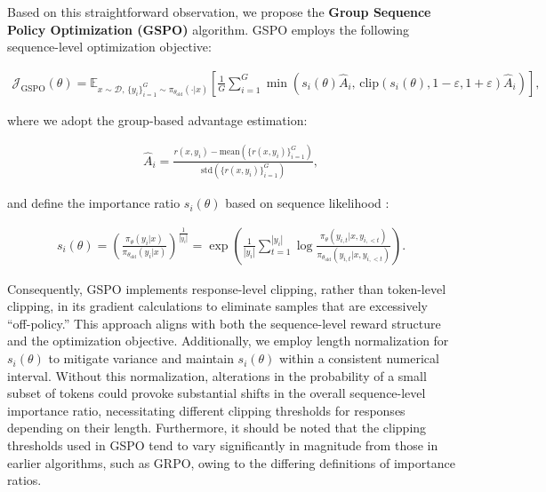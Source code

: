 Based on this straightforward observation, we propose the \textbf{Group Sequence Policy Optimization (GSPO)} algorithm. GSPO employs the following sequence-level optimization objective:

\begin{align}
\mathcal{J}_\text{GSPO} (\theta) =
\mathbb{E}_{ x \sim \mathcal{D},\, \{y_i\}_{i=1}^G \sim \pi_{\theta_\text{old}}( \cdot | x) }
\left[ 
\frac{1}{G} \sum_{i=1}^{G}
\min \left( s_{i}(\theta)  \widehat{A}_{i},  \, \mathrm{clip} \left( s_{i}(\theta), 1 - {\varepsilon}, 1 + {\varepsilon} \right) \widehat{A}_{i} \right) 
\right],
\label{equ:gspo}
\end{align}

where we adopt the group-based advantage estimation:

\begin{align}
\widehat{A}_{i} = \frac{r(x, y_i) - \mathrm{mean} \left( \{ r(x, y_i) \}_{i=1}^G \right) }{ \mathrm{std} \left( \{ r(x, y_i) \}_{i=1}^G \right) },
\end{align}

and define the importance ratio $s_{i}(\theta)$ based on sequence likelihood \citep{click}:

\begin{align}
s_{i}(\theta) = \left( \frac{ \pi_{\theta} (y_i | x) }{ \pi_{\theta_\text{old}} (y_i | x)} \right)^{\frac{1}{|y_i|}}
=
\exp \left( \frac{1}{|y_i|} \sum_{t=1}^{|y_i|} \log \frac{ \pi_{\theta} (y_{i,t} | x, y_{i,<t}) }{ \pi_{\theta_\text{old}} (y_{i,t} | x,y_{i,<t})} \right).
\end{align}

Consequently, GSPO implements response-level clipping, rather than token-level clipping, in its gradient calculations to eliminate samples that are excessively “off-policy.” This approach aligns with both the sequence-level reward structure and the optimization objective. Additionally, we employ length normalization for $s_{i}(\theta)$ to mitigate variance and maintain $s_{i}(\theta)$ within a consistent numerical interval. Without this normalization, alterations in the probability of a small subset of tokens could provoke substantial shifts in the overall sequence-level importance ratio, necessitating different clipping thresholds for responses depending on their length. Furthermore, it should be noted that the clipping thresholds used in GSPO tend to vary significantly in magnitude from those in earlier algorithms, such as GRPO, owing to the differing definitions of importance ratios.

